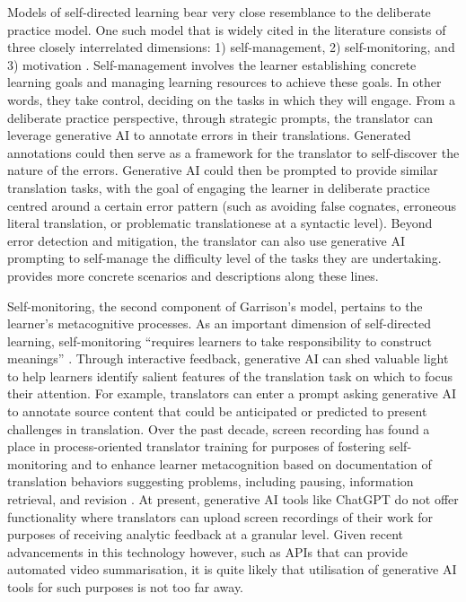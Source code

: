 \documentclass[output=paper]{langscibook}
\begin{document}
Models of self-directed learning bear very close resemblance to the deliberate practice model. One such model that is widely cited in the literature consists of three closely interrelated dimensions: 1) self-management, 2) self-monitoring, and 3) motivation \citep{garrison97}. Self-management involves the learner establishing concrete learning goals and managing learning resources to achieve these goals. In other words, they take control, deciding on the tasks in which they will engage. From a deliberate practice perspective, through strategic prompts, the translator can leverage generative AI to annotate errors in their translations. Generated annotations could then serve as a framework for the translator to self-discover the nature of the errors. Generative AI could then be prompted to provide similar translation tasks, with the goal of engaging the learner in deliberate practice centred around a certain error pattern (such as avoiding false cognates, erroneous literal translation, or problematic translationese at a syntactic level). Beyond error detection and mitigation, the translator can also use generative AI prompting to self-manage the difficulty level of the tasks they are undertaking.  provides more concrete scenarios and descriptions along these lines.

Self-monitoring, the second component of Garrison’s model, pertains to the learner’s metacognitive processes. As an important dimension of self-directed learning, self-monitoring “requires learners to take responsibility to construct meanings” \citep[24]{garrison97}. Through interactive feedback, generative AI can shed valuable light to help learners identify salient features of the translation task on which to focus their attention. For example, translators can enter a prompt asking generative AI to annotate source content that could be anticipated or predicted to present challenges in translation. Over the past decade, screen recording has found a place in process-oriented translator training for purposes of fostering self-monitoring and to enhance learner metacognition based on documentation of translation behaviors suggesting problems, including pausing, information retrieval, and revision \citep{angelone2019}. At present, generative AI tools like ChatGPT do not offer functionality where translators can upload screen recordings of their work for purposes of receiving analytic feedback at a granular level. Given recent advancements in this technology however, such as APIs that can provide automated video summarisation, it is quite likely that utilisation of generative AI tools for such purposes is not too far away.~
\end{document}
